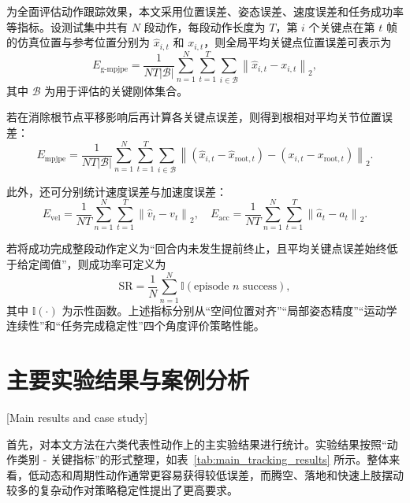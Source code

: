 为全面评估动作跟踪效果，本文采用位置误差、姿态误差、速度误差和任务成功率等指标。设测试集中共有 $N$ 段动作，每段动作长度为 $T$，第 $i$ 个关键点在第 $t$ 帧的仿真位置与参考位置分别为 $\hat{x}_{i,t}$ 和 $x_{i,t}$，则全局平均关键点位置误差可表示为
\begin{equation}
E_{\mathrm{g\text{-}mpjpe}}
=
\frac{1}{NT|\mathcal{B}|}
\sum_{n=1}^{N}\sum_{t=1}^{T}\sum_{i\in\mathcal{B}}
\left\|
\hat{x}_{i,t}-x_{i,t}
\right\|_2,
\end{equation}
其中 $\mathcal{B}$ 为用于评估的关键刚体集合。

若在消除根节点平移影响后再计算各关键点误差，则得到根相对平均关节位置误差：
\begin{equation}
E_{\mathrm{mpjpe}}
=
\frac{1}{NT|\mathcal{B}|}
\sum_{n=1}^{N}\sum_{t=1}^{T}\sum_{i\in\mathcal{B}}
\left\|
\left(\hat{x}_{i,t}-\hat{x}_{\mathrm{root},t}\right)
-
\left(x_{i,t}-x_{\mathrm{root},t}\right)
\right\|_2.
\end{equation}

此外，还可分别统计速度误差与加速度误差：
\begin{equation}
E_{\mathrm{vel}}
=
\frac{1}{NT}
\sum_{n=1}^{N}\sum_{t=1}^{T}
\left\|
\hat{v}_t-v_t
\right\|_2,
\quad
E_{\mathrm{acc}}
=
\frac{1}{NT}
\sum_{n=1}^{N}\sum_{t=1}^{T}
\left\|
\hat{a}_t-a_t
\right\|_2.
\end{equation}

若将成功完成整段动作定义为“回合内未发生提前终止，且平均关键点误差始终低于给定阈值”，则成功率可定义为
\begin{equation}
\mathrm{SR}
=
\frac{1}{N}
\sum_{n=1}^{N}
\mathbb{I}(\text{episode } n \text{ success}),
\end{equation}
其中 $\mathbb{I}(\cdot)$ 为示性函数。上述指标分别从“空间位置对齐”“局部姿态精度”“运动学连续性”和“任务完成稳定性”四个角度评价策略性能。

\section{主要实验结果与案例分析}[Main results and case study]

首先，对本文方法在六类代表性动作上的主实验结果进行统计。实验结果按照“动作类别 - 关键指标”的形式整理，如表~\ref{tab:main_tracking_results} 所示。整体来看，低动态和周期性动作通常更容易获得较低误差，而腾空、落地和快速上肢摆动较多的复杂动作对策略稳定性提出了更高要求。

